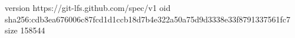 version https://git-lfs.github.com/spec/v1
oid sha256:cdb3ea676006c87fcd1d1ccb18d7b4e322a50a75d9d3338e33f8791337561fc7
size 158544
